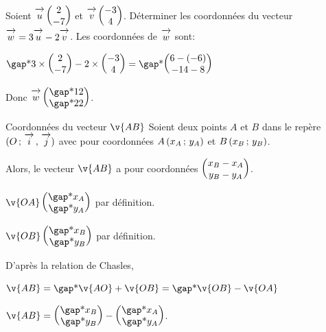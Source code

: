\documentclass[10pt,a4paper,openany,twoside, prof]{book}
\begin{document}
\begin{ex}{}{}
	Soient $\overrightarrow{\,\mathstrut u\,} \begin{pmatrix}2\\-7\end{pmatrix}$ et $\overrightarrow{\,\mathstrut v\,} \begin{pmatrix}-3\\4\end{pmatrix}$. Déterminer les coordonnées du vecteur $\overrightarrow{\,\mathstrut w\,} = 3\overrightarrow{\,\mathstrut u\,}-2\overrightarrow{\,\mathstrut v\,}$.
	Les coordonnées de $\overrightarrow{\,\mathstrut w\,}$ sont:

	$\troum{3\times\coordvp{2}{-7} -2\times\coordvp{-3}{4}} = \troum{\coordvp{6-(-6)}{-14-8}}$

	Donc $\vecw\coordvp{\troum{12}}{\troum{22}}$.
\end{ex}

\begin{prop}{Coordonnées du vecteur $\v{AB}$}{}
	Soient deux points $A$ et $B$ dans le repère $(O\,;\,\overrightarrow{\,\mathstrut i\,}\,,\,\overrightarrow{\,\mathstrut j\,})$ avec pour coordonnées $A\left(x_A\,;\,y_A\right)$ et $B\left(x_B\,;\,y_B\right)$.

	Alors, le vecteur $\v{AB}$ a pour coordonnées $\begin{pmatrix}x_B-x_A\\y_B-y_A\end{pmatrix}$.
\end{prop}

\begin{dem}{}{}
	$\v{OA} \coordvp{\troum{x_A}}{\troum{y_A}}$ par définition.

	$\v{OB} \coordvp{\troum{x_B}}{\troum{y_B}}$ par définition.

	D'après la relation de Chasles,

	$\v{AB} = \troum{\v{AO}+\v{OB}} =\troum{\v{OB}-\v{OA}}$

	$\v{AB}
		= \coordvp{\troum{x_B}}{\troum{y_B}}
		- \coordvp{\troum{x_A}}{\troum{y_A}}$.
\end{dem}
\end{document}
